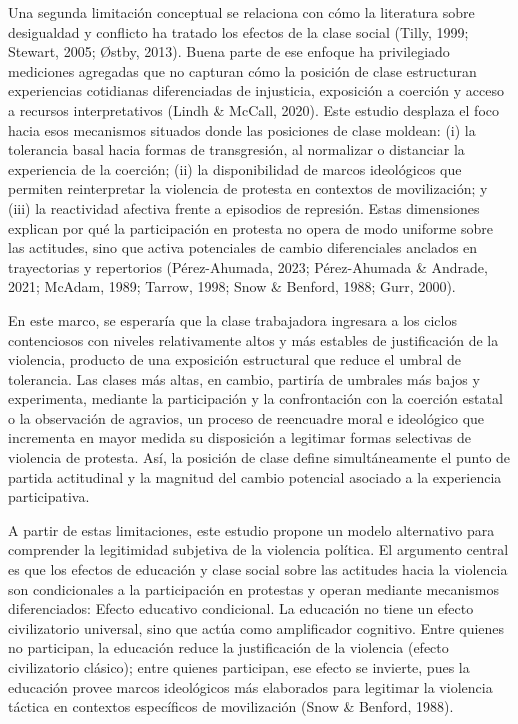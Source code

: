 \documentclass[
  13pt,
]{article}
\begin{document}
Una segunda limitación conceptual se relaciona con cómo la literatura
sobre desigualdad y conflicto ha tratado los efectos de la clase social
(Tilly, 1999; Stewart, 2005; Østby, 2013). Buena parte de ese enfoque ha
privilegiado mediciones agregadas que no capturan cómo la posición de
clase estructuran experiencias cotidianas diferenciadas de injusticia,
exposición a coerción y acceso a recursos interpretativos (Lindh \&
McCall, 2020). Este estudio desplaza el foco hacia esos mecanismos
situados donde las posiciones de clase moldean: (i) la tolerancia basal
hacia formas de transgresión, al normalizar o distanciar la experiencia
de la coerción; (ii) la disponibilidad de marcos ideológicos que
permiten reinterpretar la violencia de protesta en contextos de
movilización; y (iii) la reactividad afectiva frente a episodios de
represión. Estas dimensiones explican por qué la participación en
protesta no opera de modo uniforme sobre las actitudes, sino que activa
potenciales de cambio diferenciales anclados en trayectorias y
repertorios (Pérez-Ahumada, 2023; Pérez-Ahumada \& Andrade, 2021;
McAdam, 1989; Tarrow, 1998; Snow \& Benford, 1988; Gurr, 2000).

En este marco, se esperaría que la clase trabajadora ingresara a los
ciclos contenciosos con niveles relativamente altos y más estables de
justificación de la violencia, producto de una exposición estructural
que reduce el umbral de tolerancia. Las clases más altas, en cambio,
partiría de umbrales más bajos y experimenta, mediante la participación
y la confrontación con la coerción estatal o la observación de agravios,
un proceso de reencuadre moral e ideológico que incrementa en mayor
medida su disposición a legitimar formas selectivas de violencia de
protesta. Así, la posición de clase define simultáneamente el punto de
partida actitudinal y la magnitud del cambio potencial asociado a la
experiencia participativa.

A partir de estas limitaciones, este estudio propone un modelo
alternativo para comprender la legitimidad subjetiva de la violencia
política. El argumento central es que los efectos de educación y clase
social sobre las actitudes hacia la violencia son condicionales a la
participación en protestas y operan mediante mecanismos diferenciados:
Efecto educativo condicional. La educación no tiene un efecto
civilizatorio universal, sino que actúa como amplificador cognitivo.
Entre quienes no participan, la educación reduce la justificación de la
violencia (efecto civilizatorio clásico); entre quienes participan, ese
efecto se invierte, pues la educación provee marcos ideológicos más
elaborados para legitimar la violencia táctica en contextos específicos
de movilización (Snow \& Benford, 1988).
\end{document}
